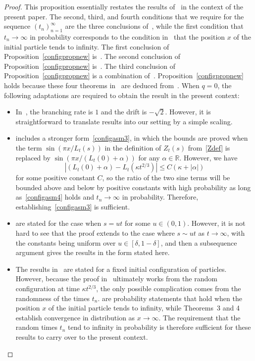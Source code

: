 \documentclass[AHL,Unicode,longabstracts,published]{cedram}
\newcommand*\R{\mathbb{R}}
\newcommand{\1} {\mathds{1}}
\begin{document}
\begin{proof}
This proposition essentially restates the results of~\cite{bbs3} in the context of the present paper. The second, third, and fourth conditions that we require for the sequence $(t_n)_{n=1}^{\infty}$ are the three conclusions of~\cite[Lemma~15]{bbs3}, while the first condition that $t_n \rightarrow \infty$ in probability corresponds to the condition in~\cite{bbs3} that the position $x$ of the initial particle tends to infinity. The first conclusion of Proposition~\ref{configpropnew} is~\cite[Theorem~1]{bbs3}. The second conclusion of Proposition~\ref{configpropnew} is~\cite[Theorem~2]{bbs3}. The third conclusion of Proposition~\ref{configpropnew} is a combination of~\cite[Theorems~3 and~4]{bbs3}. Proposition~\ref{configpropnew} holds because these four theorems in~\cite{bbs3} are deduced from~\cite[Lemma~15]{bbs3}. When $q = 0$, the following adaptations are required to obtain the result in the present context:
\begin{itemize}
\item In~\cite{bbs3}, the branching rate is $1$ and the drift is $-\sqrt{2}$. However, it is straightforward to translate results into our setting by a simple scaling.

\item \cite[Lemma~15]{bbs3} includes a stronger form~\eqref{configasm3}, in which the bounds are proved when the term $\sin(\pi x/L_t(s))$ in the definition of $Z_t(s)$ from~\eqref{Zdef} is replaced by $\sin(\pi x/(L_t(0) + \alpha))$ for any $\alpha \in \R$. However, we have
\[
\left|\left(L_t(0) + \alpha\right) - L_t\left(\kappa t^{2/3}\right)\right| \leq C(\kappa + |\alpha|)
\]
for some positive constant $C$, so the ratio of the two sine terms will be bounded above and below by positive constants with high probability as long as~\eqref{configasm4} holds and $t_n \rightarrow \infty$ in probability. Therefore, establishing~\eqref{configasm3} is sufficient.

\item \cite[Theorems~2, 3, and~4]{bbs3} are stated for the case when $s = ut$ for some $u \in (0, 1)$. However, it is not hard to see that the proof extends to the case where $s \sim ut$ as $t \rightarrow \infty$, with the constants being uniform over $u \in [\delta, 1 - \delta]$, and then a subsequence argument gives the results in the form stated here.

\item The results in~\cite{bbs3} are stated for a fixed initial configuration of particles. However, because the proof in~\cite{bbs3} ultimately works from the random configuration at time $\kappa t^{2/3}$, the only possible complication comes from the randomness of the times $t_n$. \cite[Theorems~1 and~2]{bbs3} are probability statements that hold when the position $x$ of the initial particle tends to infinity, while Theorems~3 and 4 establish convergence in distribution as $x \rightarrow \infty$. The requirement that the random times $t_n$ tend to infinity in probability is therefore sufficient for these results to carry over to the present context.


\end{itemize}
\end{proof}
\end{document}
